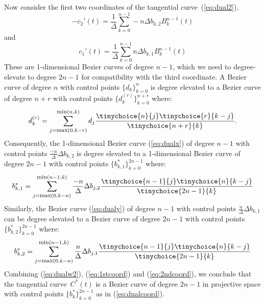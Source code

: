 \documentclass[9pt,twocolumn]{article}
\newcommand{\tang}{tangential curve\ }
\begin{document}
Now consider the first two coordinates of the \tang (\ref{eq:dual2}), 
\begin{equation}
\label{eq:dualx}
-c_2'(t) = \frac{1}{\Delta} \sum_{k=0}^{n-1} -n \Delta b_{k,2} B_k^{n-1}(t)
\end{equation}
and
\begin{equation}
\label{eq:dualy}
c_1'(t)  = \frac{1}{\Delta} \sum_{k=0}^{n-1}  n \Delta b_{k,1} B_k^{n-1}(t)
\end{equation}
These are 1-dimensional Bezier curves of degree $n-1$,
which we need to degree-elevate to degree $2n-1$
for compatibility with the third coordinate.
%
A Bezier curve of degree $n$ with control points $\{ d_k \}_{k=0}^n$ 
is degree elevated \cite{farin97} to a Bezier curve of degree $n+r$ with control points
$\{ d_k^{(r)} \}_{k=0}^{n+r}$ where:
\[
d_k^{(r)} = \sum_{j=\mbox{\footnotesize{max}}(0,k-r)}^{\mbox{\footnotesize{min}}(n,k)} 
		d_j \frac{\tinychoice{n}{j} \tinychoice{r}{k-j} }{ \tinychoice{n+r}{k} }.
\]
Consequently, the 1-dimensional Bezier curve (\ref{eq:dualx}) 
of degree $n-1$ with control points $\frac{-n}{\Delta} \Delta b_{k,2}$
is degree elevated to a 1-dimensional Bezier curve of degree $2n-1$
with control points $\{b^*_{k,1} \}_{k=0}^{2n-1}$ where:
\begin{equation}
\label{eq:1stcoord}
b^*_{k,1} = 
\sum_{j=\mbox{\footnotesize{max}}(0,k-n)}^{\mbox{\footnotesize{min}}(n-1,k)} 
	\frac{-n}{\Delta} \Delta b_{j,2}
	\frac{ \tinychoice{n-1}{j} \tinychoice{n}{k-j} }{ \tinychoice{2n-1}{k} }
\end{equation}
%
%
Similarly, the Bezier curve (\ref{eq:dualy})
of degree $n-1$ with control points $\frac{n}{\Delta} \Delta b_{k,1}$ 
can be degree elevated to a Bezier curve of degree $2n-1$ with control points 
$\{b^*_{k,2} \}_{k=0}^{2n-1}$ where:
\begin{equation}
\label{eq:2ndcoord}
b^*_{k,2} = 
\sum_{j=\mbox{\footnotesize{max}}(0,k-n)}^{\mbox{\footnotesize{min}}(n-1,k)} 
	\frac{n}{\Delta} \Delta b_{j,1}
	\frac{ \tinychoice{n-1}{j} \tinychoice{n}{k-j} }{ \tinychoice{2n-1}{k} }
\end{equation}
%
Combining (\ref{eq:dualw2}), (\ref{eq:1stcoord}) and (\ref{eq:2ndcoord}),
we conclude that the \tang $C^*(t)$
is a Bezier curve of degree $2n-1$ in projective space with control points 
$\{b^*_k\}_{k=0}^{2n-1}$ as in (\ref{eq:dualcoord}).
\QED
\end{document}
